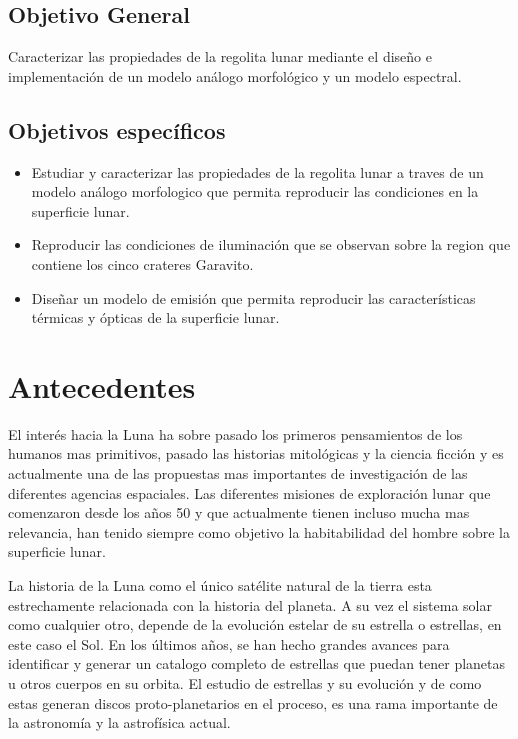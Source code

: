 \documentclass[12pt]{article}
\begin{document}
\subsection{Objetivo General}
Caracterizar las propiedades de la regolita lunar mediante el diseño e  implementación de un modelo análogo morfológico y un modelo espectral.

\subsection{Objetivos específicos}
\begin{itemize}
    \item Estudiar y caracterizar las propiedades de la regolita lunar a traves de un modelo análogo morfologico que permita reproducir las condiciones en la superficie lunar.
    \item Reproducir las condiciones de iluminación que se observan sobre la region que contiene los cinco crateres Garavito.
    \item Diseñar un modelo de emisión que permita reproducir las características térmicas y ópticas de la superficie lunar.
\end{itemize}

\section{Antecedentes}
El interés hacia la Luna ha sobre pasado los primeros pensamientos de los humanos mas primitivos, pasado las historias mitológicas y la ciencia ficción y es actualmente una de las propuestas mas 
importantes de investigación de las diferentes agencias espaciales. Las diferentes misiones de exploración lunar que comenzaron desde los años 50 y que actualmente tienen incluso mucha mas relevancia, 
han tenido siempre como objetivo la habitabilidad del hombre sobre la superficie lunar. 

La historia de la Luna como el único satélite natural de la tierra esta estrechamente relacionada con la historia del planeta. A su vez el sistema solar como cualquier otro, depende de 
la evolución estelar de su estrella o estrellas, en este caso el Sol. En los últimos años, se han hecho grandes avances para identificar y generar un catalogo completo de estrellas que puedan tener planetas 
u otros cuerpos en su orbita. El estudio de estrellas y su evolución y de como estas generan discos proto-planetarios en el proceso, es una rama importante de la astronomía y la astrofísica actual.
\end{document}
